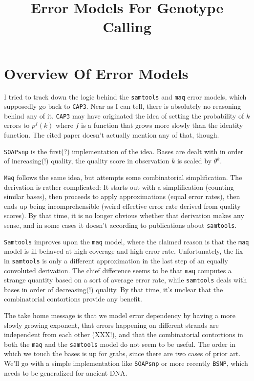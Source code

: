 \documentclass{article}
\title{Error Models For Genotype Calling}
\begin{document}
\maketitle

\section{Overview Of Error Models}

I tried to track down the logic behind the \texttt{samtools} and
\texttt{maq} error models, which supposedly go back to \texttt{CAP3}.
Near as I can tell, there is absolutely no reasoning behind any of it.
\texttt{CAP3} may have originated the idea of setting the probability of
$k$ errors to $p^f(k)$ where $f$ is a function that grows more slowly
than the identity function.  The cited paper doesn't actually mention
any of that, though.

\texttt{SOAPsnp} is the first(?) implementation of the idea.  Bases are
dealt with in order of increasing(!) quality, the quality score in
observation $k$ is scaled by $\theta^k$.

\texttt{Maq} follows the same idea, but attempts some combinatorial
simplification.  The derivation is rather complicated:  It starts out
with a simplification (counting similar bases), then proceeds to apply
approximations (equal error rates), then ends up being incomprehensible
(weird effective error rate derived from quality scores).  By that time,
it is no longer obvious whether that derivation makes any sense, and in
some cases it doesn't according to publications about \texttt{samtools}.

\texttt{Samtools} improves upon the \texttt{maq} model, where the
claimed reason is that the \texttt{maq} model is ill-behaved at high
coverage and high error rate.  Unfortunately, the fix in
\texttt{samtools} is only a different approximation in the last step of
an equally convoluted derivation.  The chief difference seems to be that
\texttt{maq} computes a strange quantity based on a sort of average
error rate, while \texttt{samtools} deals with bases in order of
decreasing(!) quality.  By that time, it's unclear that the
combinatorial contortions provide any benefit.

The take home message is that we model error dependency by having a more
slowly growing exponent, that errors happening on different strands are
independent from each other (XXX!), and that the combinatorial
contortions in both the \texttt{maq} and the \texttt{samtools} model do
not seem to be useful.  The order in which we touch the bases is up for
grabs, since there are two cases of prior art.  We'll go with a simple
implementation like \texttt{SOAPsnp} or more recently \texttt{BSNP},
which needs to be generalized for ancient DNA.
\end{document}
